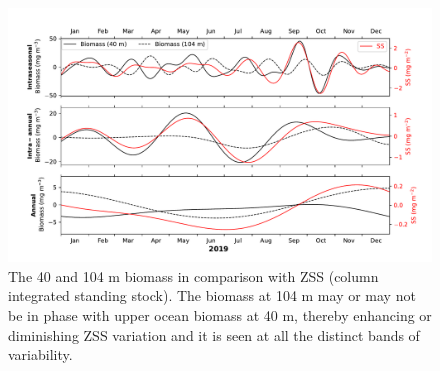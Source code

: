 \documentclass[12pt,a4paper]{article}
\begin{document}
\begin{figure}[htbp]
	\centering
	\includegraphics[width=\textwidth]{./figures/ss_biomass_comparison_intraseasonal_band.pdf} 
	\caption{The 40 and 104 m biomass in comparison with ZSS (column integrated standing stock). The biomass at 104 m may or may not be in phase with upper ocean biomass at 40 m, thereby enhancing or diminishing ZSS variation and it is seen at all the distinct bands of variability.}
	\label{fig:40_104_biomass_zss}
\end{figure}
\end{document}
